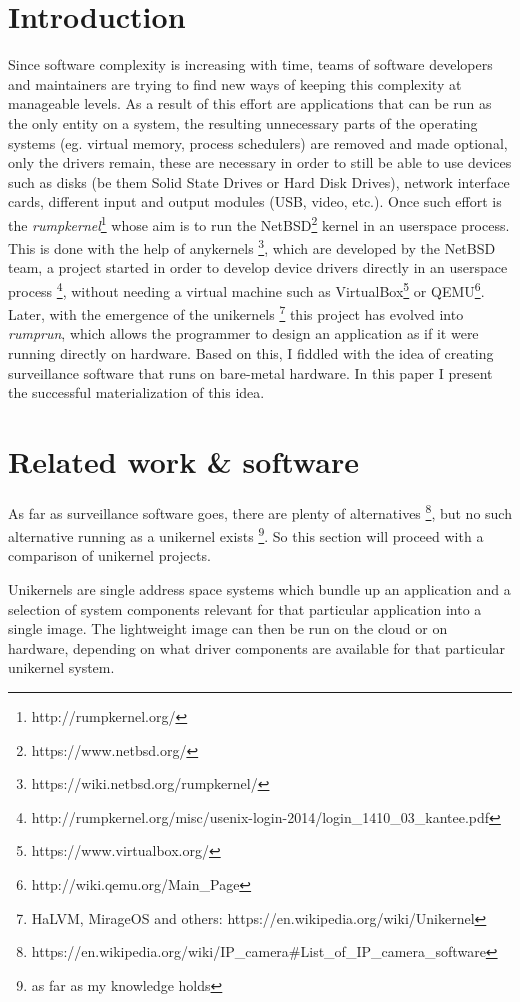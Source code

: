 \documentclass[10pt,a4paper,twoside]{article}
\begin{document}
\section{Introduction}
Since software complexity is increasing with time, teams of software developers and maintainers are trying to
find new ways of keeping this complexity at manageable levels. As a result of this effort are applications
that can be run as the only entity on a system,
the resulting unnecessary parts of the operating systems (eg. virtual memory, process schedulers) are removed
and made optional, only the drivers
remain, these are necessary in order to still be able to use devices
such as disks (be them Solid State Drives or Hard Disk Drives), network interface cards, different input and
output modules (USB, video, etc.).
Once such effort is the \textit{rumpkernel}\footnote{http://rumpkernel.org/}
 whose aim is to run the NetBSD\footnote{https://www.netbsd.org/} kernel in an userspace process.
 This is done with the help of anykernels \footnote{https://wiki.netbsd.org/rumpkernel/}, which are developed
 by the NetBSD team, a project started in order to develop device drivers directly in an userspace process
 \footnote{http://rumpkernel.org/misc/usenix-login-2014/login\_1410\_03\_kantee.pdf},
 without needing a virtual machine such as VirtualBox\footnote{https://www.virtualbox.org/} or
 QEMU\footnote{http://wiki.qemu.org/Main\_Page}.
Later, with the emergence of the unikernels
\footnote{HaLVM, MirageOS and others: https://en.wikipedia.org/wiki/Unikernel} this project has evolved into
\textit{rumprun}, which allows the programmer to design an application as if it were running directly on hardware.
Based on this, I fiddled with the idea of creating surveillance software that runs on bare-metal hardware.
In this paper I present the successful materialization of this idea.

\section{Related work \& software}
As far as surveillance software goes, there are plenty of alternatives
\footnote{https://en.wikipedia.org/wiki/IP\_camera\#List\_of\_IP\_camera\_software},
 but no such alternative running as a unikernel exists
 \footnote{as far as my knowledge holds}.
 So this section will proceed with a comparison of unikernel projects.

Unikernels are single address space systems which bundle up an application and a
selection of system components relevant for that particular application into a single image.
The lightweight image can then be run on the cloud or on hardware, depending on what driver
components are available for that particular unikernel system.
\end{document}
